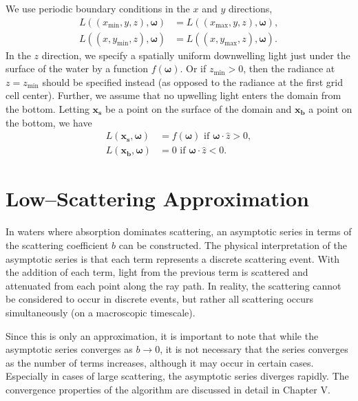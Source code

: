 \documentclass[ms,cpyr,lof,lot]{uathesis}
\newcommand\xmin{{x_{\min}}}
\newcommand\xmax{{x_{\max}}}
\newcommand\ymin{{y_{\min}}}
\newcommand\ymax{{y_{\max}}}
\newcommand\zmin{{z_{\min}}}
\renewcommand\vec\bm
\begin{document}
We use periodic boundary conditions in the $x$ and $y$ directions,
\begin{align*}
  L\left((\xmin, y, z), \vec{\omega}\right) &= L\left((\xmax, y, z), \vec{\omega}\right), \\
  L\left((x, \ymin, z), \vec{\omega}\right) &= L\left((x, \ymax, z), \vec{\omega}\right).
\end{align*}
In the $z$ direction, we specify a spatially uniform downwelling light just
under the surface of the water by a function $f(\vec{\omega})$.
Or if $\zmin>0$, then the radiance at $z=\zmin$ should be specified instead (as opposed to the radiance at the first grid cell center).
Further, we assume that no upwelling light enters the domain from the bottom.
Letting $\vec{x_s}$ be a point on the surface of the domain and $\vec{x_b}$ a point on the bottom, we have
\begin{align*}
  L(\vec{x_s}, \vec{\omega}) &= f(\vec{\omega}) \mbox{ if } \vec{\omega} \cdot \hat{z} > 0, \\
  L(\vec{x_b}, \vec{\omega}) &= 0 \mbox { if } \vec{\omega} \cdot \hat{z} < 0.
\end{align*}

\section{Low--Scattering Approximation}
\label{sec:symbolic_asymptotics}
In waters where absorption dominates scattering, an asymptotic series in terms of the scattering coefficient $b$ can be constructed.
The physical interpretation of the asymptotic series is that each term represents a discrete scattering event.
With the addition of each term, light from the previous term is scattered and attenuated from each point along the ray path.
In reality, the scattering cannot be considered to occur in discrete events, but rather all scattering occurs simultaneously (on a macroscopic timescale).

Since this is only an approximation, it is important to note that while the asymptotic series converges as $b \to 0$, it is not necessary that the series converges as the number of terms increases, although it may occur in certain cases.
Especially in cases of large scattering, the asymptotic series diverges rapidly.
The convergence properties of the algorithm are discussed in detail in Chapter V.
\end{document}
